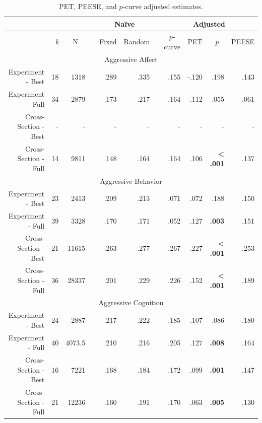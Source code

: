 \documentclass[man, mask]{apa6}
\begin{document}
\begin{table}[htbp]
	\centering
	\caption{PET, PEESE, and $p$-curve adjusted estimates.}
	\begin{tabular}{rrrrrrrrrrr}
		\toprule
		&       &       &       & \multicolumn{2}{c}{Na{\"i}ve} & \multicolumn{1}{c}{} & \multicolumn{4}{c}{Adjusted} \\
		\midrule
		& \textit{k} & \multicolumn{1}{c}{N} & \multicolumn{1}{c}{} & \multicolumn{1}{c}{Fixed} & \multicolumn{1}{c}{Random} & \multicolumn{1}{c}{} & \multicolumn{1}{c}{$p$-curve} & \multicolumn{1}{c}{PET} & \multicolumn{1}{c}{\textit{p}} & \multicolumn{1}{c}{PEESE} \\
		\multicolumn{11}{c}{Aggressive Affect} \\
		Experiment - Best & 18    & 1318  &       & .289 & .335 &       & .155 & -.120 & .198 & .143 \\
		Experiment - Full & 34    & 2879  &       & .173 & .217 &       & .164 & -.112 & .055 & .061 \\
		Cross-Section - Best & -     & -     &       & -     & -     &       & -     & -     & -     & - \\
		Cross-Section - Full & 14    & 9811  &       & .148 & .164 &       & .164 & .106 & \textbf{< .001} & .137 \\
		\multicolumn{11}{c}{Aggressive Behavior} \\
		Experiment - Best & 23    & 2413  &       & .209 & .213 &       & .071 & .072 & .188 & .150 \\
		Experiment - Full & 39    & 3328  &       & .170 & .171 &       & .052 & .127 & \textbf{.003} & .151 \\
		Cross-Section - Best & 21    & 11615 &       & .263 & .277 &       & .267 & .227 & \textbf{< .001} & .253 \\
		Cross-Section - Full & 36    & 28337 &       & .201 & .229 &       & .226 & .152 & \textbf{< .001} & .189 \\
		\multicolumn{11}{c}{Aggressive Cognition} \\
		Experiment - Best & 24    & 2887  &       & .217 & .222 &       & .185 & .107 & .086 & .180 \\
		Experiment - Full & 40    & 4073.5 &       & .210 & .216 &       & .205 & .127 & \textbf{.008} & .164 \\
		Cross-Section - Best & 16    & 7221  &       & .168 & .184 &       & .172 & .099 & \textbf{.001} & .147 \\
		Cross-Section - Full & 21    & 12236 &       & .160 & .191 &       & .170 & .063 & \textbf{.005} & .130 \\

\end{tabular}
\end{table}
\end{document}
